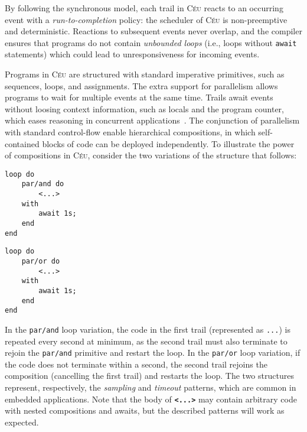 \documentclass[pdftex,12pt,a4paper]{article}
\newcommand{\CEU}{\textsc{C\'{e}u}\xspace}
\newcommand{\code}[1] {{\small{\texttt{#1}}}}
\begin{document}
By following the synchronous model, each trail in \CEU reacts to an occurring 
event with a \emph{run-to-completion} policy: the scheduler of \CEU is 
non-preemptive and deterministic.
%
Reactions to subsequent events never overlap, and the compiler ensures that 
programs do not contain \emph{unbounded loops} (i.e., loops without 
\code{await} statements) which could lead to unresponsiveness for incoming 
events.
%

Programs in \CEU are structured with standard imperative primitives, such as 
sequences, loops, and assignments.
The extra support for parallelism allows programs to wait for multiple events 
at the same time.
Trails await events without loosing context information, such as locals and the 
program counter, which eases reasoning in concurrent 
applications~\cite{sync_async.cooperative}.
%
The conjunction of parallelism with standard control-flow enable hierarchical 
compositions, in which self-contained blocks of code can be deployed 
independently.
%
To illustrate the power of compositions in \CEU, consider the two variations of 
the structure that follows:

\begin{minipage}[t]{0.35\linewidth}
\begin{lstlisting}
loop do
    par/and do
        <...>
    with
        await 1s;
    end
end
\end{lstlisting}
\end{minipage}
%
\hspace{1cm}
%
\begin{minipage}[t]{0.35\linewidth}
\begin{lstlisting}
loop do
    par/or do
        <...>
    with
        await 1s;
    end
end
\end{lstlisting}
\end{minipage}

In the \code{par/and} loop variation, the code in the first trail (represented 
as \code{...}) is repeated every second at minimum, as the second trail must 
also terminate to rejoin the \code{par/and} primitive and restart the loop.
%
In the \code{par/or} loop variation, if the code does not terminate within a 
second, the second trail rejoins the composition (cancelling the first trail) 
and restarts the loop.
%
The two structures represent, respectively, the \emph{sampling} and 
\emph{timeout} patterns, which are common in embedded applications.
%
Note that the body of \textbf{\code{<...>}} may contain arbitrary code with 
nested compositions and awaits, but the described patterns will work as 
expected.
\end{document}
